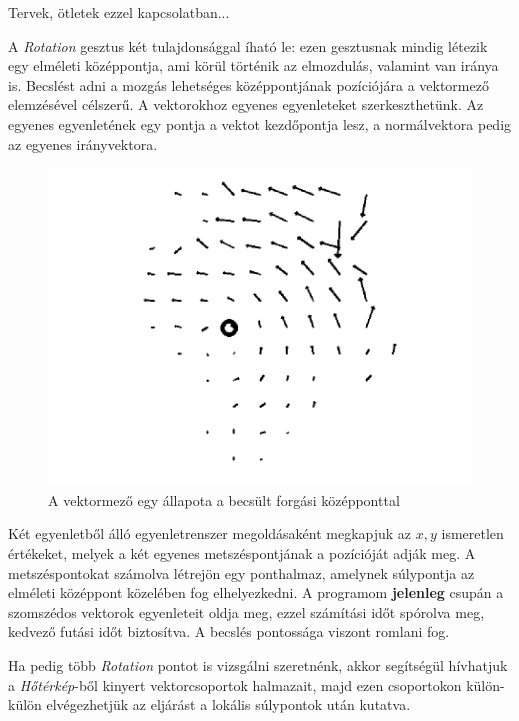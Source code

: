 Tervek, ötletek ezzel kapcsolatban...


A \textit{Rotation} gesztus két tulajdonsággal íható le: ezen gesztusnak mindig létezik egy elméleti középpontja, ami körül történik az elmozdulás, valamint van iránya is.
Becslést adni a mozgás lehetséges középpontjának pozíciójára a vektormező elemzésével célszerű.
A vektorokhoz egyenes egyenleteket szerkeszthetünk. Az egyenes egyenletének egy pontja a vektot kezdőpontja lesz, a normálvektora pedig az egyenes irányvektora.

\begin{figure}[h]
\centering
\includegraphics[width=11.2truecm, height=6.3truecm]{images/swirl_screenshot.png}
\caption{A vektormező egy állapota a becsült forgási középponttal}
\label{fig:heatmap}
\end{figure}

Két egyenletből álló egyenletrenszer megoldásaként megkapjuk az $x,y$ ismeretlen értékeket, melyek a két egyenes metszéspontjának a pozícióját adják meg.
A metszéspontokat számolva létrejön egy ponthalmaz, amelynek súlypontja az elméleti középpont közelében fog elhelyezkedni.
A programom \textbf{jelenleg} csupán a szomszédos vektorok egyenleteit oldja meg, ezzel számítási időt spórolva meg, kedvező futási időt biztosítva. A becslés pontossága viszont romlani fog.

Ha pedig több \textit{Rotation} pontot is vizsgálni szeretnénk, akkor segítségül hívhatjuk a \textit{Hőtérkép}-ből kinyert vektorcsoportok halmazait, majd ezen csoportokon külön-külön elvégezhetjük az eljárást a lokális súlypontok után kutatva.

